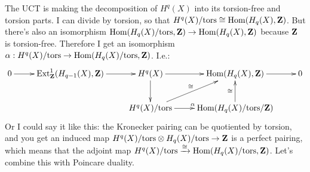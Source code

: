 The UCT is making the decomposition of $H^q(X)$ into its torsion-free and torsion parts. I can divide by torsion, so that $H^q(X)/\mathrm{tors}\cong \operatorname{Hom}(H_q(X),\mathbf Z)$. But there's also an isomorphism $\operatorname{Hom}(H_q(X)/\mathrm{tors},\mathbf Z)\to \operatorname{Hom}(H_q(X),\mathbf Z)$ because $\mathbf Z$ is torsion-free. Therefore I get an isomorphism $\alpha:H^q(X)/\mathrm{tors}\to \operatorname{Hom}(H_q(X)/\mathrm{tors},\mathbf Z)$. I.e.:
\begin{equation*}
\xymatrix{
	0\ar[r] & \Ext^1_\Z(H_{q-1}(X),\Z)\ar[r] & H^{q}(X)\ar[r]\ar[d] & \Hom(H_q(X),\Z)\ar[r] & 0\\
 & & H^q(X)/\mathrm{tors}\ar[ur]^{\cong}\ar[r]^{\alpha} & \Hom(H_q(X)/\mathrm{tors}/\Z)\ar[u]^{\cong}
}
\end{equation*}
Or I could say it like this: the Kronecker pairing can be quotiented by torsion, and you get an induced map $H^q(X)/\mathrm{tors}\otimes H_q(X)/\mathrm{tors}\to\mathbf Z$ is a perfect pairing, which means that the adjoint map $H^q(X)/\mathrm{tors}\xrightarrow{\cong}\operatorname{Hom}(H_q(X)/\mathrm{tors},\mathbf Z)$. Let's combine this with Poincare duality.

